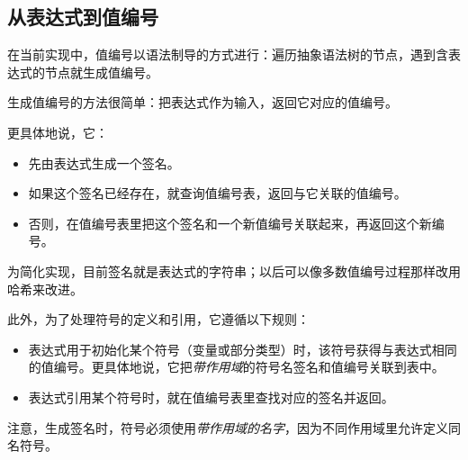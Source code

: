 \subsection*{从表达式到值编号}

在当前实现中，值编号以语法制导的方式进行：遍历抽象语法树的节点，遇到含表达式的节点就生成值编号。

生成值编号的方法很简单：把表达式作为输入，返回它对应的值编号。

更具体地说，它：

\begin{itemize}[leftmargin=1.6em]
\item 先由表达式生成一个签名。
\item 如果这个签名已经存在，就查询值编号表，返回与它关联的值编号。
\item 否则，在值编号表里把这个签名和一个新值编号关联起来，再返回这个新编号。
\end{itemize}

为简化实现，目前签名就是表达式的字符串；以后可以像多数值编号过程那样改用哈希来改进。

此外，为了处理符号的定义和引用，它遵循以下规则：

\begin{itemize}[leftmargin=1.6em]
\item 表达式用于初始化某个符号（变量或部分类型）时，该符号获得与表达式相同的值编号。更具体地说，它把\emph{带作用域}的符号名签名和值编号关联到表中。
\item 表达式引用某个符号时，就在值编号表里查找对应的签名并返回。
\end{itemize}

注意，生成签名时，符号必须使用\emph{带作用域的名字}，因为不同作用域里允许定义同名符号。
